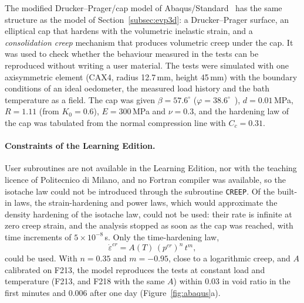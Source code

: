 The modified Drucker--Prager/cap model of Abaqus/Standard~\cite{abaqus2026} has the same structure as the model of Section~\ref{subsec:evp3d}: a Drucker--Prager surface, an elliptical cap that hardens with the volumetric inelastic strain, and a \emph{consolidation creep} mechanism that produces volumetric creep under the cap. It was used to check whether the behaviour measured in the tests can be reproduced without writing a user material. The tests were simulated with one axisymmetric element (CAX4, radius 12.7\,mm, height 45\,mm) with the boundary conditions of an ideal oedometer, the measured load history and the bath temperature as a field. The cap was given $\beta = 57.6^\circ$ ($\varphi = 38.6^\circ$~\cite{agarwal2023}), $d = 0.01$\,MPa, $R = 1.11$ (from $K_0 = 0.6$), $E = 300$\,MPa and $\nu = 0.3$, and the hardening law of the cap was tabulated from the normal compression line with $C_c = 0.31$.

\paragraph{Constraints of the Learning Edition.} User subroutines are not available in the Learning Edition, nor with the teaching licence of Politecnico di Milano, and no Fortran compiler was available, so the isotache law could not be introduced through the subroutine \texttt{CREEP}. Of the built-in laws, the strain-hardening and power laws, which would approximate the density hardening of the isotache law, could not be used: their rate is infinite at zero creep strain, and the analysis stopped as soon as the cap was reached, with time increments of $5\times10^{-8}$\,s. Only the time-hardening law,
\begin{equation}
    \dot\varepsilon^{cr} = A(T)\,(p^{cr})^{n}\,t^{m},
    \label{eq:abq_timehard}
\end{equation}
could be used. With $n = 0.35$ and $m = -0.95$, close to a logarithmic creep, and $A$ calibrated on F213, the model reproduces the tests at constant load and temperature (F213, and F218 with the same $A$) within 0.03 in void ratio in the first minutes and 0.006 after one day (Figure~\ref{fig:abaqus}a).

